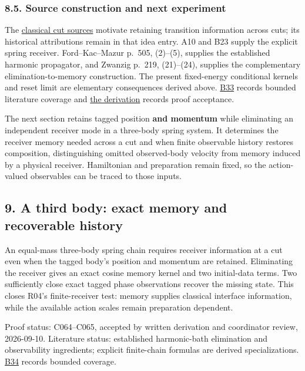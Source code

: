 \documentclass[11pt,a4paper]{article}
\begin{document}
\hypertarget{source-construction-and-next-experiment}{%
\subsubsection{8.5. Source construction and next
experiment}\label{source-construction-and-next-experiment}}

The \href{ancient-cuts-provenance.md}{classical cut sources} motivate
retaining transition information across cuts; its historical
attributions remain in that idea entry. A10 and B23 supply the explicit
spring receiver. Ford--Kac--Mazur p.~505, (2)--(5), supplies the
established harmonic propagator, and Zwanzig p.~219, (21)--(24),
supplies the complementary elimination-to-memory construction. The
present fixed-energy conditional kernels and reset limit are elementary
consequences derived above. \href{../references/batches/B33.md}{B33}
records bounded literature coverage and
\href{conservative-harmonic-receiver.md}{the derivation} records proof
acceptance.

The next section retains tagged position \textbf{and momentum} while
eliminating an independent receiver mode in a three-body spring system.
It determines the receiver memory needed across a cut and when finite
observable history restores composition, distinguishing omitted
observed-body velocity from memory induced by a physical receiver.
Hamiltonian and preparation remain fixed, so the action-valued
observables can be traced to those inputs.

\hypertarget{a-third-body-exact-memory-and-recoverable-history}{%
\subsection{9. A third body: exact memory and recoverable
history}\label{a-third-body-exact-memory-and-recoverable-history}}

An equal-mass three-body spring chain requires receiver information at a
cut even when the tagged body's position and momentum are retained.
Eliminating the receiver gives an exact cosine memory kernel and two
initial-data terms. Two sufficiently close exact tagged phase
observations recover the missing state. This closes R04's
finite-receiver test: memory supplies classical interface information,
while the available action scales remain preparation dependent.

Proof status: C064--C065, accepted by written derivation and coordinator
review, 2026-09-10. Literature status: established harmonic-bath
elimination and observability ingredients; explicit finite-chain
formulas are derived specializations.
\href{../references/batches/B34.md}{B34} records bounded coverage.
\end{document}
